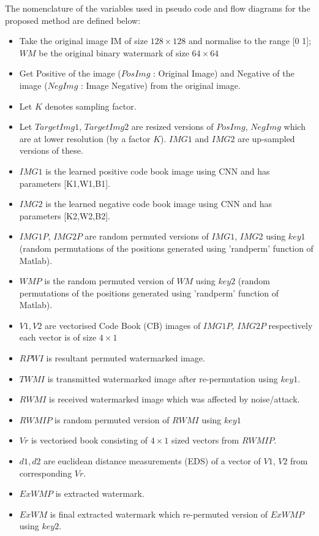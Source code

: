 The nomenclature of the variables used in pseudo code and flow diagrams for the proposed method are defined below:
 \begin{itemize}
 \item Take the original image IM of size $128\times128$ and normalise to the range [0 1]; $ WM $ be the original binary watermark of size $64\times64$
 \item Get Positive of the image ($PosImg$ : Original Image) and Negative of the image ($NegImg$ : Image Negative) from the original image.
 \item Let $K$ denotes sampling factor.
 \item Let $TargetImg1$, $TargetImg2$ are resized versions of $PosImg$, $NegImg$ which are at lower resolution (by a factor $K$). $IMG1$ and $IMG2$ are up-sampled versions of these.
 \item $IMG1$ is the learned positive code book image using CNN and has parameters [K1,W1,B1].
 \item $IMG2$ is the learned negative code book image using CNN and has parameters [K2,W2,B2].
 \item $IMG1P$, $IMG2P$ are random permuted versions of $IMG1$, $IMG$2 using $key1$ (random permutations of the positions generated using 'randperm' function of Matlab).
 \item $WMP$ is the random permuted version of $WM$ using $key2$ (random permutations of the positions generated using 'randperm' function of Matlab).
 \item $V1,V2$ are vectorised Code Book (CB) images of $IMG1P$, $IMG2P$ respectively each vector is of size $4\times1$
 \item $RPWI$ is resultant permuted watermarked image.
 \item $TWMI$ is transmitted watermarked image after re-permutation using $key1$.
 \item $RWMI$ is received watermarked image which was affected by noise/attack.
 \item $RWMIP$ is random permuted version of $RWMI$ using $key1$
 \item $Vr$ is vectorised book consisting of $4\times1$ sized vectors from $RWMIP$.
 \item $d1, d2$ are euclidean distance measurements (EDS) of a vector of $V1$, $V2$ from corresponding $Vr$. 
 \item $ExWMP$ is extracted watermark.
 \item $ExWM$ is final extracted watermark which re-permuted version of $ExWMP$ using $key2$. 
 
 \end{itemize}
 
